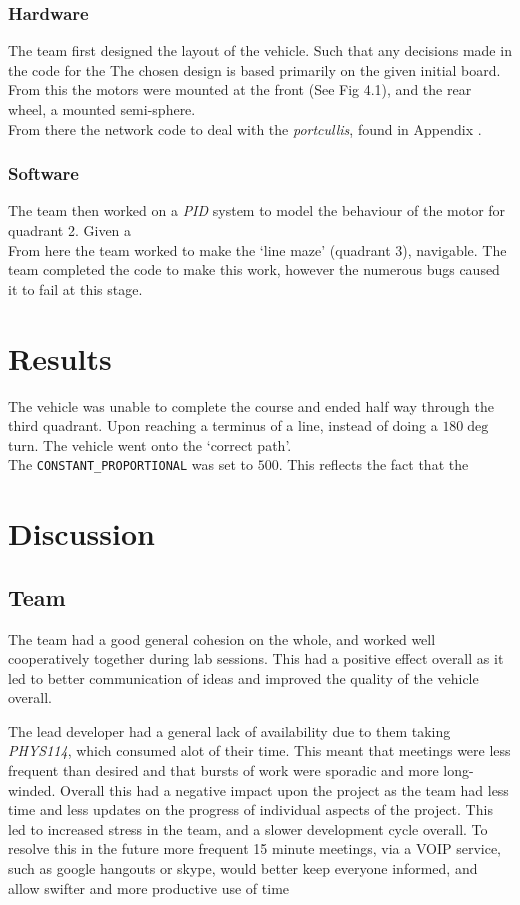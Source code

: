 \documentclass[paper=a4, fontsize=11pt]{scrartcl} %
\numberwithin{equation}{section} %
\numberwithin{figure}{section} %
\begin{document}
\subsubsection{Hardware}
The team first designed the layout of the vehicle. Such that any decisions made
in the code for the  The chosen design is based
primarily on the given initial board. From this the motors were mounted at the
front (See Fig 4.1), and the rear wheel, a mounted semi-sphere.\\
From there the network code to deal with the \textit{portcullis}, found in
Appendix %
.\\
\subsubsection{Software}
The team then worked on a \textit{PID} system to model the behaviour of the
motor for quadrant 2. Given a \\
From here the team worked to make the `line maze' (quadrant 3), navigable. The
team completed the code to make this work, however the numerous bugs caused it
to fail at this stage.

\section{Results}
The vehicle was unable to complete the course and ended half way through the
third quadrant. Upon reaching a terminus of a line, instead of doing a $180\deg$
turn. The vehicle went onto the `correct path'.\\
The \verb|CONSTANT_PROPORTIONAL| was set to $500$. This reflects the fact that
the 

\section{Discussion}
\subsection{Team}
The team had a good general cohesion on the whole, and worked well cooperatively
together during lab sessions. This had a positive effect overall as it led to
better communication of ideas and improved the quality of the vehicle overall.

The lead developer had a general lack of availability due to them
taking \textit{PHYS114}, which consumed alot of their time. This meant that
meetings were less frequent than desired and that bursts of work were
sporadic and more long-winded. Overall this had a negative impact upon the
project as the team had less time and less updates on the progress of individual
aspects of the project.  This led to increased stress in the team, and a slower
development cycle overall. To resolve this in the future more frequent 15 minute
meetings, via a VOIP service, such as google hangouts or skype, would better
keep everyone informed, and allow swifter and more productive use of time\\
\end{document}
